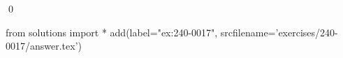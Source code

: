 
\begin{ex} 
  \label{ex:240-0017}
  
  \qed
\end{ex} 
\begin{python0}
from solutions import *
add(label="ex:240-0017",
    srcfilename='exercises/240-0017/answer.tex') 
\end{python0}
